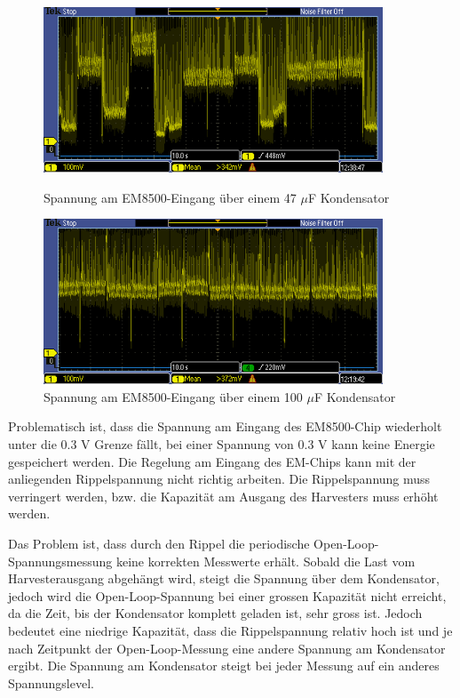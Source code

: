 \begin{figure}[ht]
   \begin{minipage}[t]{0.5\textwidth}
     \includegraphics[width=0.90\textwidth]{3Vorgehen/imag/VCC_47uF_15kmh_Periode.PNG}
     \caption{Spannung am EM8500-Eingang über einem 47 $\mu$F Kondensator}
	 \label{VCC_47uF_15kmh_Periode}
  \end{minipage}
  \begin{minipage}[t]{0.5\textwidth}
    \includegraphics[width=0.90\textwidth]{3Vorgehen/imag/VCC_100uF_15kmh_Periode.PNG}
    \caption{Spannung am EM8500-Eingang über einem 100 $\mu$F Kondensator}
	\label{VCC_100uF_15kmh_Periode}
  \end{minipage} 
\end{figure}

Problematisch ist, dass die Spannung am Eingang des EM8500-Chip wiederholt unter die 0.3 V Grenze fällt, bei einer Spannung von 0.3 V kann keine Energie gespeichert werden. Die Regelung am Eingang des EM-Chips kann mit der anliegenden Rippelspannung nicht richtig arbeiten. Die Rippelspannung muss verringert werden, bzw. die Kapazität am Ausgang des Harvesters muss erhöht werden. 

Das Problem ist, dass durch den Rippel die periodische Open-Loop-Spannungsmessung keine korrekten Messwerte erhält. Sobald die Last vom Harvesterausgang abgehängt wird, steigt die Spannung über dem Kondensator, jedoch wird die Open-Loop-Spannung bei einer grossen Kapazität nicht erreicht, da die Zeit, bis der Kondensator komplett geladen ist, sehr gross ist. Jedoch bedeutet eine niedrige Kapazität, dass die Rippelspannung relativ hoch ist und je nach Zeitpunkt der Open-Loop-Messung eine andere Spannung am Kondensator ergibt. Die Spannung am Kondensator steigt bei jeder Messung auf ein anderes Spannungslevel.

